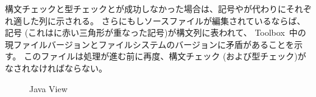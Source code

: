 \documentclass[\pformat,12pt]{jarticle}
\newcommand{\Toolbox}{Toolbox}
\begin{document}
構文チェックと型チェックとが成功しなかった場合は、記号やが代わりにそれぞれ適した列に示される。
さらにもしソースファイルが編集されているならば、記号  (これはに赤い三角形が重なった記号)が構文列に表われて、 \Toolbox\ 中の現ファイルバージョンとファイルシステムのバージョンに矛盾があることを示す。
このファイルは処理が進む前に再度、構文チェック (および型チェック)がなされなければならない。

\begin{figure}[tbh]
\begin{center}
\caption{Java View}\label{fig:javaView}
\end{center}
\end{figure}
\end{document}
